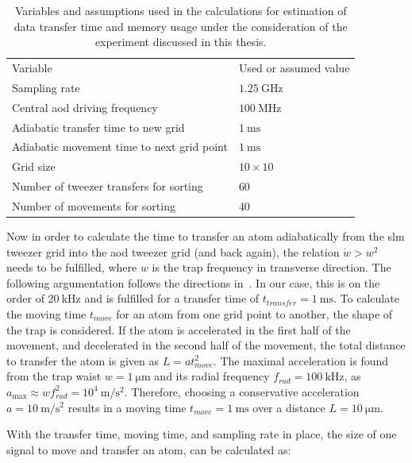 \begin{table}[tbp]%
\centering
\begin{tabular}{l l}
	\toprule \toprule
	Variable & Used or assumed value \\ \thickhline%
	Sampling rate & $\SI{1.25}{\giga\hertz}$ \\
	Central \ac{aod} driving frequency & $\SI{100}{\mega\hertz}$ \\
	Adiabatic transfer time to new grid & $\SI{1}{\milli\second}$ \\
	Adiabatic movement time to next grid point & $\SI{1}{\milli\second}$ \\
	Grid size & $10\times10$ \\
	Number of tweezer transfers for sorting & 60 \\
	Number of movements for sorting & 40 \\
	\bottomrule \bottomrule
\end{tabular}
\caption{Variables and assumptions used in the calculations for estimation of data transfer time and memory usage under the consideration of the experiment discussed in this thesis.}
\label{tbl:spectrum_assumptions}
\end{table}

Now in order to calculate the time to transfer an atom adiabatically from the \ac{slm} tweezer grid into the \ac{aod} tweezer grid (and back again), the relation $\dot{w} > w^2$ needs to be fulfilled, where $w$ is the trap frequency in transverse direction. The following argumentation follows the directions in~\cite{Leseleuc2018}. In our case, this is on the order of $\SI{20}{\kilo\hertz}$ and is fulfilled for a transfer time of $t_{transfer} = \SI{1}{\milli\second}$. To calculate the moving time $t_{move}$ for an atom from one grid point to another, the shape of the trap is considered. If the atom is accelerated in the first half of the movement, and decelerated in the second half of the movement, the total distance to transfer the atom is given as $L=a t_{move}^2$. The maximal acceleration is found from the trap waist $w = \SI{1}{\micro\meter}$ and its radial frequency $f_{rad} = \SI{100}{\kilo\hertz}$, as $a_{\max} \approx w f_{rad}^2 = 10^4\SI{}{\meter\per\second\squared}$. Therefore, choosing a conservative acceleration $a=\SI{10}{\meter\per\second\squared}$ results in a moving time $t_{move} = \SI{1}{\milli\second}$ over a distance $L=\SI{10}{\micro\meter}$.

With the transfer time, moving time, and sampling rate in place, the size of one signal to move and transfer an atom, can be calculated as:

